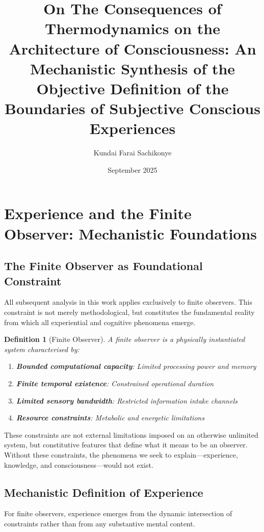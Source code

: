 \documentclass{article}
\title{On The Consequences of Thermodynamics on the Architecture of Consciousness: An Mechanistic Synthesis of the Objective Definition of the Boundaries of Subjective Conscious Experiences }
\author{Kundai Farai Sachikonye}
\date{September 2025}
\newtheorem{definition}[theorem]{Definition}
\begin{document}
\maketitle

\tableofcontents

\section{Experience and the Finite Observer: Mechanistic Foundations}

\subsection{The Finite Observer as Foundational Constraint}

All subsequent analysis in this work applies exclusively to finite observers. This constraint is not merely methodological, but constitutes the fundamental reality from which all experiential and cognitive phenomena emerge.

\begin{definition}[Finite Observer]
A finite observer is a physically instantiated system characterised by:
\begin{enumerate}
\item \textbf{Bounded computational capacity}: Limited processing power and memory
\item \textbf{Finite temporal existence}: Constrained operational duration
\item \textbf{Limited sensory bandwidth}: Restricted information intake channels
\item \textbf{Resource constraints}: Metabolic and energetic limitations
\end{enumerate}
\end{definition}

These constraints are not external limitations imposed on an otherwise unlimited system, but constitutive features that define what it means to be an observer. Without these constraints, the phenomena we seek to explain—experience, knowledge, and consciousness—would not exist.

\subsection{Mechanistic Definition of Experience}

For finite observers, experience emerges from the dynamic intersection of constraints rather than from any substantive mental content.
\end{document}
